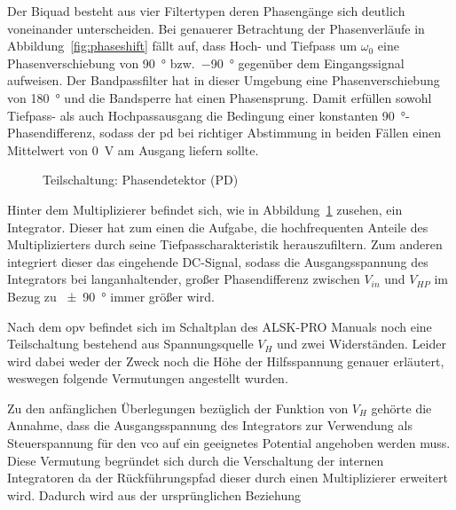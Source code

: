 \documentclass[../main.tex]{subfiles}
\begin{document}


Der Biquad besteht aus vier Filtertypen deren Phasengänge sich deutlich voneinander unterscheiden. Bei genauerer Betrachtung der Phasenverläufe in Abbildung~\ref{fig:phaseshift} fällt auf, dass Hoch- und Tiefpass um $\omega_0$ eine Phasenverschiebung von \SI{90}{\degree} bzw.~\SI{-90}{\degree} gegenüber dem Eingangssignal aufweisen. Der Bandpassfilter hat in dieser Umgebung eine Phasenverschiebung von \SI{180}{\degree} und die Bandsperre hat einen Phasensprung. Damit erfüllen sowohl Tiefpass- als auch Hochpassausgang die Bedingung einer konstanten \SI{90}{\degree}-Phasendifferenz, sodass der \gls{pd} bei richtiger Abstimmung in beiden Fällen einen Mittelwert von \SI{0}{\volt} am Ausgang liefern sollte. \par %
\medskip

\begin{figure}[H]
  \centering
  \resizebox{0.8\textwidth}{!}{}
  \caption{Teilschaltung: Phasendetektor (PD)}
  \label{fig:sb_phasedetector}
\end{figure}

Hinter dem Multiplizierer befindet sich, wie in Abbildung~\ref{fig:sb_phasedetector} zusehen, ein Integrator. Dieser hat zum einen die Aufgabe, die hochfrequenten Anteile des Multiplizierters durch seine Tiefpasscharakteristik herauszufiltern. Zum anderen integriert dieser das eingehende DC-Signal, sodass die Ausgangsspannung des Integrators bei langanhaltender, großer Phasendifferenz zwischen $V_{in}$ und $V_{HP}$ im Bezug zu \SI{\pm 90}{\degree} immer größer wird.\par
\medskip

Nach dem \gls{opv} befindet sich im Schaltplan des ALSK-PRO Manuals noch eine Teilschaltung bestehend aus Spannungsquelle $V_H$ und zwei Widerständen. Leider wird dabei weder der Zweck noch die Höhe der Hilfsspannung genauer erläutert, weswegen folgende Vermutungen angestellt wurden.\par
\medskip
Zu den anfänglichen Überlegungen bezüglich der Funktion von $V_H$ gehörte die Annahme, dass die Ausgangsspannung des Integrators zur Verwendung als Steuerspannung für den \gls{vco} auf ein geeignetes Potential angehoben werden muss. Diese Vermutung begründet sich durch die Verschaltung der internen Integratoren da der Rückführungspfad dieser durch einen Multiplizierer erweitert wird. Dadurch wird aus der ursprünglichen Beziehung
\end{document}
